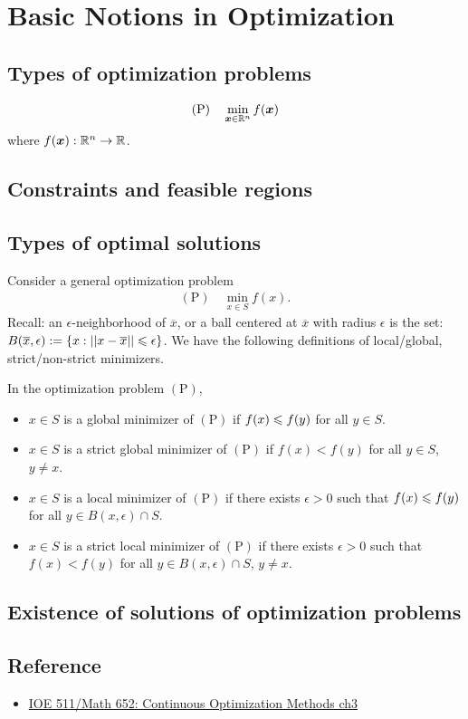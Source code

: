 \chapter{Basic Notions in Optimization}

\section{Types of optimization problems}
\begin{align*}
    (\text{P})\quad \min_{\boldsymbol{x}\in \mathbb{R}^n} f(\boldsymbol{x})
\end{align*}
where $f(\boldsymbol{x}):\mathbb{R}^n\rightarrow\mathbb{R}$.

\section{Constraints and feasible regions}



\section{Types of optimal solutions}
Consider a general optimization problem 
\begin{align}
    (\text{P})\quad \min_{x\in S} f(x).
\end{align}
Recall: an $\epsilon$-neighborhood of $\overline{x}$, or a ball centered at $\overline{x}$ 
with radius $\epsilon$ is the set:
$B(\overline{x}, \epsilon) := \{x : || x - \overline{x}|| \leqslant \epsilon \}$.
We have the following definitions of local/global, strict/non-strict minimizers.
\begin{definition}{}{}
    In the optimization problem $(\text{P})$,
    \begin{itemize}
        \item $x\in S$ is a global minimizer of $(\text{P})$ if $f(x)\leqslant f(y)$ for all $y\in S$.
        \item $x\in S$ is a strict global minimizer of $(\text{P})$ if $f(x)< f(y)$ for all $y\in S$, $y\neq x$.
        \item $x\in S$ is a local minimizer of $(\text{P})$ if there exists $\epsilon>0$ such that $f(x)\leqslant f(y)$ for all $y\in B(x,\epsilon)\cap S$.
        \item $x\in S$ is a strict local minimizer of $(\text{P})$ if there exists $\epsilon>0$ such that $f(x)< f(y)$ for all $y\in B(x,\epsilon)\cap S$, $y\neq x$.
    \end{itemize}
\end{definition}
\section{Existence of solutions of optimization problems}

\section{Reference}
\begin{itemize}
    \item \href{}{IOE 511/Math 652: Continuous Optimization Methods ch3}
\end{itemize}

